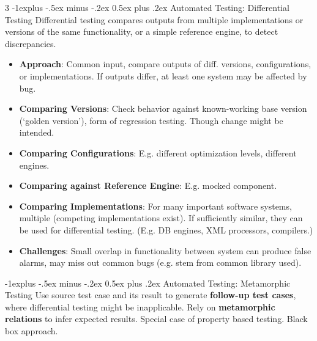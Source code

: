 \documentclass[a4paper, 10pt, landscape]{article}
\makeatletter
\renewcommand{\subsection}{\@startsection{subsection}{2}{0mm}%
                                {-1explus -.5ex minus -.2ex}%
                                {0.5ex plus .2ex}%
                                {\normalfont\normalsize\bfseries}}
\makeatother
\begin{document}
\begin{multicols*}{3}
\subsection{Automated Testing: Differential Testing}
Differential testing compares outputs from multiple implementations or versions of the same functionality, or a simple reference engine, to detect discrepancies.
\begin{itemize}
\item \textbf{Approach}: Common input, compare outputs of diff. versions, configurations, or implementations. If outputs differ, at least one system may be affected by bug.
\item \textbf{Comparing Versions}: Check behavior against known-working base version (`golden version'), form of regression testing. Though change might be intended.
\item \textbf{Comparing Configurations}: E.g. different optimization levels, different engines.
\item \textbf{Comparing against Reference Engine}: E.g. mocked component.
\item \textbf{Comparing Implementations}: For many important software systems, multiple (competing 
implementations exist).  If sufficiently similar, they can be used for differential testing. (E.g. DB engines, XML processors, compilers.)
\item \textbf{Challenges}: Small overlap in functionality between system can produce false alarms, may miss out common bugs (e.g. stem from common library used).
\end{itemize}

\subsection{Automated Testing: Metamorphic Testing}
Use source test case and its result to generate \textbf{follow-up test cases}, where differential testing might be inapplicable. Rely on \textbf{metamorphic relations} to infer expected results. Special case of property based testing. Black box approach.


\end{multicols*}
\end{document}
